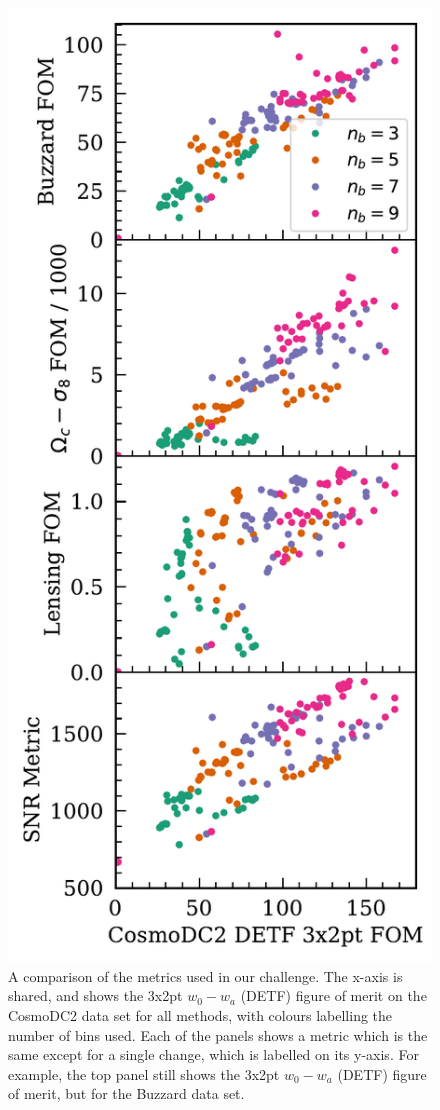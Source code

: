 \documentclass[twocolumn,twocolappendix]{aastex63}
\begin{document}
\begin{figure}[htbp]
\includegraphics[width=0.9\linewidth]{results/metric_comparisons.pdf}
\caption{A comparison of the metrics used in our challenge. The x-axis is shared, and shows
the 3x2pt $w_0 - w_a$ (DETF) figure of merit on the CosmoDC2 data set for all methods, 
with colours labelling the number
of bins used.  Each of the panels shows a metric which is the same except for a single change, 
which is labelled on its y-axis.  For example, the top panel still shows the 3x2pt $w_0 - w_a$ (DETF) figure of merit,
but for the Buzzard data set.}
\label{fig:metrics}
\end{figure}
\end{document}
